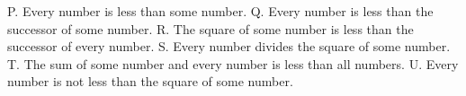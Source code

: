P. Every number is less than some number.
Q. Every number is less than the successor of some number.
R. The square of some number is less than the successor of every number.
S. Every number divides the square of some number.
T. The sum of some number and every number is less than all numbers.
U. Every number is not less than the square of some number.



